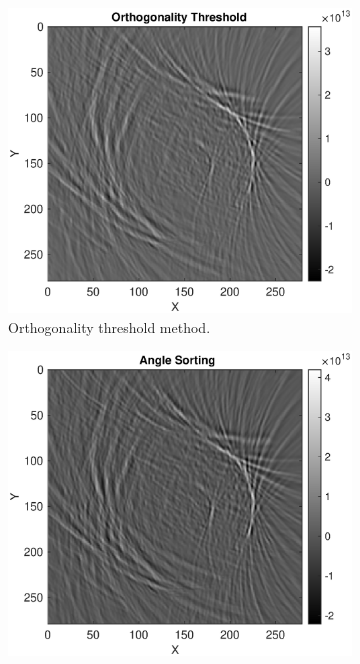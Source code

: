 \begin{figure}[H]
     \centering
     \begin{subfigure}[b]{0.49\textwidth}
         \centering
        \includegraphics[width=1.12\linewidth,right]{Graphics/Results/Diff_angle_sort_orthogonality/diff_ortho_bubble_slice_166_3_ortho.eps}
         \caption{Orthogonality threshold method.}
         \label{fig:res:slice_diff_bubble_ortho_image_ortho}
     \end{subfigure}
     \hfill
     \begin{subfigure}[b]{0.49\textwidth}
         \centering
         \includegraphics[width=1.12\textwidth,right]{Graphics/Results/Diff_angle_sort_orthogonality/diff_ortho_bubble_slice_166_3_sort.eps}

\end{subfigure}
\end{figure}
